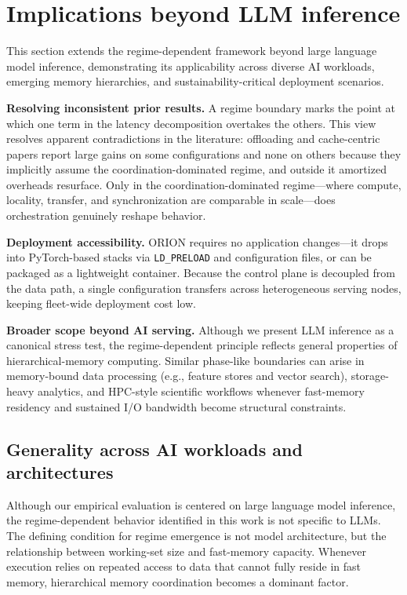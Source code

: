 \section{Implications beyond LLM inference}
\label{sec:implications}

This section extends the regime-dependent framework beyond large language model inference, demonstrating its applicability across diverse AI workloads, emerging memory hierarchies, and sustainability-critical deployment scenarios.


\noindent\textbf{Resolving inconsistent prior results.}
A regime boundary marks the point at which one term in the latency
decomposition overtakes the others.
This view resolves apparent contradictions in the literature: offloading
and cache-centric papers report large gains on some configurations and none
on others because they implicitly assume the coordination-dominated regime,
and outside it amortized overheads resurface.
Only in the coordination-dominated regime---where compute, locality, transfer,
and synchronization are comparable in scale---does orchestration genuinely
reshape behavior.

\noindent\textbf{Deployment accessibility.}
ORION requires no application changes---it drops into PyTorch-based
stacks via \texttt{LD\_PRELOAD} and configuration files, or can be
packaged as a lightweight container.
Because the control plane is decoupled from the data path, a single
configuration transfers across heterogeneous serving nodes, keeping
fleet-wide deployment cost low.

\noindent\textbf{Broader scope beyond AI serving.} Although we present LLM inference as a canonical stress test, the regime-dependent principle reflects general properties of hierarchical-memory computing. Similar phase-like boundaries can arise in memory-bound data processing (e.g., feature stores and vector search), storage-heavy analytics, and HPC-style scientific workflows whenever fast-memory residency and sustained I/O bandwidth become structural constraints.


\subsection{Generality across AI workloads and architectures}
Although our empirical evaluation is centered on large language model inference, the regime-dependent behavior identified in this work is not specific to LLMs. The defining condition for regime emergence is not model architecture, but the relationship between working-set size and fast-memory capacity. Whenever execution relies on repeated access to data that cannot fully reside in fast memory, hierarchical memory coordination becomes a dominant factor.

